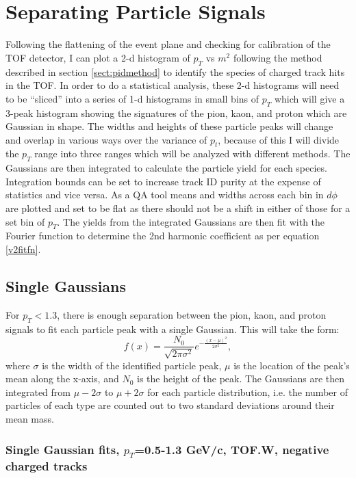 \section{Separating Particle Signals}
Following the flattening of the event plane and checking for calibration of the TOF detector, I can plot a 2-d histogram of $p_T$ vs $m^2$ following the method described in section \ref{sect:pidmethod} to identify the species of charged track hits in the TOF. In order to do a statistical analysis, these 2-d histograms will need to be ``sliced'' into a series of 1-d histograms in small bins of $p_T$ which will give a 3-peak histogram showing the signatures of the pion, kaon, and proton which are Gaussian in shape. The widths and heights of these particle peaks will change and overlap in various ways over the variance of $p_t$, because of this I will divide the $p_T$ range into three ranges which will be analyzed with different methods. The Gaussians are then integrated to calculate the particle yield for each species. Integration bounds can be set to increase track ID purity at the expense of statistics and vice versa. As a QA tool means and widths across each bin in $d\phi$ are plotted and set to be flat as there should not be a shift in either of those for a set bin of $p_T$. The yields from the integrated Gaussians are then fit with the Fourier function to determine the 2nd harmonic coefficient as per equation \ref{v2fitfn}.

\subsection{Single Gaussians}
For $p_T< 1.3$, there is enough separation between the pion, kaon, and proton signals to fit each particle peak with a single Gaussian. This will take the form:
\begin{equation}
f(x) = \frac{N_0}{\sqrt{2\pi \sigma^2}} e^{-\frac{(x-\mu)^2}{2\sigma^{2}}},
\end{equation}
where $\sigma$ is the width of the identified particle peak, $\mu$ is the location of the peak's mean along the x-axis, and $N_0$ is the height of the peak. The Gaussians are then integrated from $\mu-2\sigma$ to $\mu+2\sigma$ for each particle distribution, i.e. the number of particles of each type are counted out to two standard deviations around their mean mass. 

\subsubsection{Single Gaussian fits, $p_T$=0.5-1.3 GeV/c, TOF.W, negative charged tracks}

